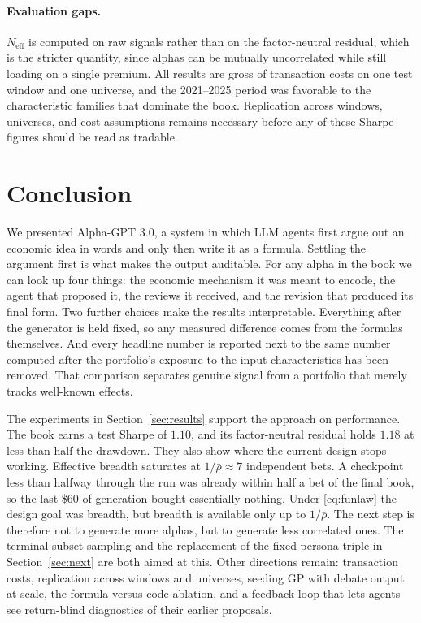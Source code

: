 \documentclass{article}
\theoremstyle{definition}
\theoremstyle{plain}
\theoremstyle{remark}
\begin{document}
\paragraph{Evaluation gaps.} $N_{\mathrm{eff}}$ is computed on raw signals rather than
on the factor-neutral residual, which is the stricter quantity, since alphas can be
mutually uncorrelated while still loading on a single premium. All results are gross of
transaction costs on one test window and one universe, and the 2021--2025 period was
favorable to the characteristic families that dominate the book. Replication across
windows, universes, and cost assumptions remains necessary before any of these Sharpe
figures should be read as tradable.

\section{Conclusion}

We presented Alpha-GPT 3.0, a system in which LLM agents first argue out an economic
idea in words and only then write it as a formula. Settling the argument first is what
makes the output auditable. For any alpha in the book we can look up four things: the
economic mechanism it was meant to encode, the agent that proposed it, the reviews it
received, and the revision that produced its final form. Two further choices make the
results interpretable. Everything after the generator is held fixed, so any measured
difference comes from the formulas themselves. And every headline number is reported next
to the same number computed after the portfolio's exposure to the input characteristics
has been removed. That comparison separates genuine signal from a portfolio that merely
tracks well-known effects.

The experiments in Section~\ref{sec:results} support the approach on performance. The
book earns a test Sharpe of $1.10$, and its factor-neutral residual holds $1.18$ at less
than half the drawdown. They also show where the current design stops working. Effective
breadth saturates at $1/\bar\rho\approx7$ independent bets. A checkpoint less than
halfway through the run was already within half a bet of the final book, so the last
\$60 of generation bought essentially nothing. Under \eqref{eq:funlaw} the design goal
was breadth, but breadth is available only up to $1/\bar\rho$. The next step is therefore
not to generate more alphas, but to generate less correlated ones. The terminal-subset
sampling and the replacement of the fixed persona triple in Section~\ref{sec:next} are
both aimed at this. Other directions remain: transaction costs, replication across
windows and universes, seeding GP with debate output at scale, the formula-versus-code
ablation, and a feedback loop that lets agents see return-blind diagnostics of their
earlier proposals.
\end{document}
